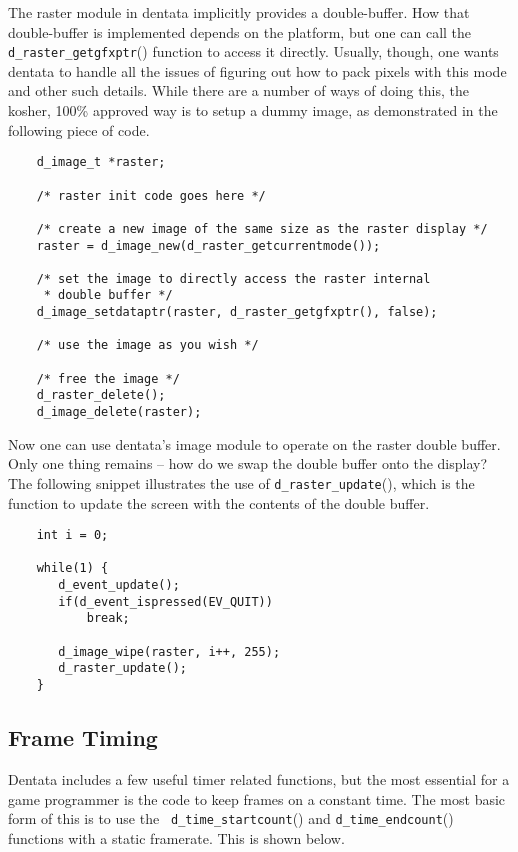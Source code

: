 The raster module in dentata implicitly provides a double-buffer.  How
that double-buffer is implemented depends on the platform, but one can
call the {\tt d\_raster\_getgfxptr}() function to access it
directly. Usually, though, one wants dentata to handle all the issues
of figuring out how to pack pixels with this mode and other such
details. While there are a number of ways of doing this, the kosher,
100\% approved way is to setup a dummy image, as demonstrated in the
following piece of code.

\begin{verbatim}
    d_image_t *raster;

    /* raster init code goes here */

    /* create a new image of the same size as the raster display */
    raster = d_image_new(d_raster_getcurrentmode());

    /* set the image to directly access the raster internal
     * double buffer */
    d_image_setdataptr(raster, d_raster_getgfxptr(), false);

    /* use the image as you wish */

    /* free the image */
    d_raster_delete();
    d_image_delete(raster);
\end{verbatim}

Now one can use dentata's image module to operate on the raster
double buffer. Only one thing remains -- how do we swap the double
buffer onto the display? The following snippet illustrates the use
of {\tt d\_raster\_update}(), which is the function to update the
screen with the contents of the double buffer.

\begin{verbatim}
    int i = 0;

    while(1) {
       d_event_update();
       if(d_event_ispressed(EV_QUIT))
           break;

       d_image_wipe(raster, i++, 255);
       d_raster_update();
    }
\end{verbatim}

\subsection{Frame Timing}

Dentata includes a few useful timer related functions, but the most
essential for a game programmer is the code to keep frames on a
constant time. The most basic form of this is to use the {\tt
d\_time\_startcount}() and {\tt d\_time\_endcount}() functions with a
static framerate. This is shown below.

